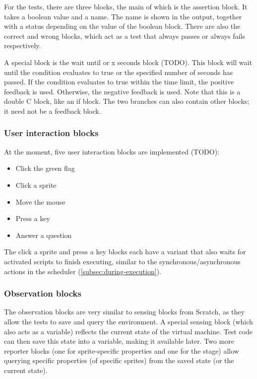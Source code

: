 \documentclass[../main]{subfiles}
\begin{document}
For the tests, there are three blocks, the main of which is the assertion block.
It takes a boolean value and a name.
The name is shown in the output, together with a status depending on the value of the boolean block.
There are also the correct and wrong blocks, which act as a test that always passes or always fails respectively.

A special block is the wait until or x seconds block (TODO).
This block will wait until the condition evaluates to true or the specified number of seconds has passed.
If the condition evaluates to true within the time limit, the positive feedback is used.
Otherwise, the negative feedback is used.
Note that this is a double C block, like an if block.
The two branches can also contain other blocks; it need not be a feedback block.

\subsubsection{User interaction blocks}

At the moment, five user interaction blocks are implemented (TODO):

\begin{itemize}
    \item Click the green flag
    \item Click a sprite
    \item Move the mouse
    \item Press a key
    \item Answer a question
\end{itemize}

The click a sprite and press a key blocks each have a variant that also waits for activated scripts to finish executing, similar to the synchronous/asynchronous actions in the scheduler (\cref{subsec:during-execution}).

\subsubsection{Observation blocks}

The observation blocks are very similar to sensing blocks from Scratch, as they allow the tests to save and query the environment.
A special sensing block (which also acts as a variable) reflects the current state of the virtual machine.
Test code can then save this state into a variable, making it available later.
Two more reporter blocks (one for sprite-specific properties and one for the stage) allow querying specific properties (of specific sprites) from the saved state (or the current state).
\end{document}
